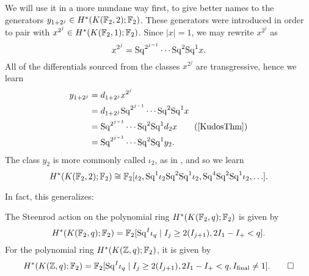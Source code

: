 \begin{example}
We will use it in a more mundane way first, to give better names to the generators $y_{1+2^j} \in H^*(K(\mathbb F_2, 2); \mathbb F_2)$.
These generators were introduced in order to pair with $x^{2^j} \in H^*(K(\mathbb F_2, 1); \mathbb F_2)$.
Since $|x| = 1$, we may rewrite $x^{2^j}$ as \[x^{2^j} = \mathrm{Sq}^{2^{j-1}} \cdots \mathrm{Sq}^2 \mathrm{Sq}^1 x.\]
All of the differentials sourced from the classes $x^{2^j}$ are transgressive, hence we learn
\begin{align*}
y_{1+2^j} & = d_{1+2^j} x^{2^j} \\
& = d_{1+2^j} \Sq^{2^{j-1}} \cdots \Sq^2 \Sq^1 x \\
& = \Sq^{2^{j-1}} \cdots \Sq^2 \Sq^1 d_2 x \tag{\Cref{KudosThm}} \\
& = \Sq^{2^{j-1}} \cdots \Sq^2 \Sq^1 y_2.
\end{align*}
The class $y_2$ is more commonly called $\iota_2$, as in , and so we learn \[H^*(K(\mathbb F_2, 2); \mathbb F_2) \cong \mathbb F_2[\iota_2, \mathrm{Sq}^1 \iota_2 \mathrm{Sq}^2 \mathrm{Sq}^1 \iota_2, \mathrm{Sq}^4 \mathrm{Sq}^2 \mathrm{Sq}^1 \iota_2, \ldots].\]
\end{example}

In fact, this generalizes:

\begin{theorem}\label{EMCohAsASteenrodAlg}%
The Steenrod action on the polynomial ring $H^*(K(\mathbb F_2, q); \mathbb F_2)$ is given by \[H^*(K(\mathbb F_2, q); \mathbb F_2) = \mathbb F_2[\mathrm{Sq}^I \iota_q \mid I_j \ge 2(I_{j+1}), 2I_1 - I_+ < q].\]
For the polynomial ring $H^*(K(\mathbb Z, q); \mathbb F_2)$, it is given by \[H^*(K(\mathbb Z, q); \mathbb F_2) = \mathbb F_2[\mathrm{Sq}^I \iota_q \mid I_j \ge 2(I_{j+1}), 2I_1 - I_+ < q, I_{\text{final}} \ne 1]. \qed\]
\end{theorem}




